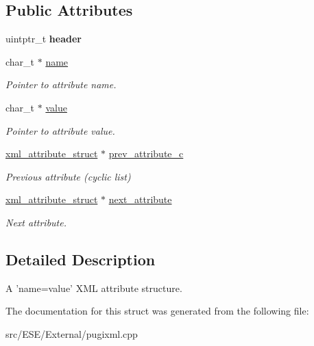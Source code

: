 \subsection*{Public Attributes}
\begin{DoxyCompactItemize}
\item 
\hypertarget{structpugi_1_1xml__attribute__struct_a0dca6ca6c129bbf87a7ebaf87f3e12de}{uintptr\-\_\-t {\bfseries header}}\label{structpugi_1_1xml__attribute__struct_a0dca6ca6c129bbf87a7ebaf87f3e12de}

\item 
\hypertarget{structpugi_1_1xml__attribute__struct_aa886c4aae23a132e1704717721ee2c19}{char\-\_\-t $\ast$ \hyperlink{structpugi_1_1xml__attribute__struct_aa886c4aae23a132e1704717721ee2c19}{name}}\label{structpugi_1_1xml__attribute__struct_aa886c4aae23a132e1704717721ee2c19}

\begin{DoxyCompactList}\small\item\em Pointer to attribute name. \end{DoxyCompactList}\item 
\hypertarget{structpugi_1_1xml__attribute__struct_ae652627d56cb9dcc0afdd1fbf6570364}{char\-\_\-t $\ast$ \hyperlink{structpugi_1_1xml__attribute__struct_ae652627d56cb9dcc0afdd1fbf6570364}{value}}\label{structpugi_1_1xml__attribute__struct_ae652627d56cb9dcc0afdd1fbf6570364}

\begin{DoxyCompactList}\small\item\em Pointer to attribute value. \end{DoxyCompactList}\item 
\hypertarget{structpugi_1_1xml__attribute__struct_a0e3a022235b316e4cfc1034ceb7d7862}{\hyperlink{structpugi_1_1xml__attribute__struct}{xml\-\_\-attribute\-\_\-struct} $\ast$ \hyperlink{structpugi_1_1xml__attribute__struct_a0e3a022235b316e4cfc1034ceb7d7862}{prev\-\_\-attribute\-\_\-c}}\label{structpugi_1_1xml__attribute__struct_a0e3a022235b316e4cfc1034ceb7d7862}

\begin{DoxyCompactList}\small\item\em Previous attribute (cyclic list) \end{DoxyCompactList}\item 
\hypertarget{structpugi_1_1xml__attribute__struct_a9860c0eb7fa72dc9b69ee9b0575f9efc}{\hyperlink{structpugi_1_1xml__attribute__struct}{xml\-\_\-attribute\-\_\-struct} $\ast$ \hyperlink{structpugi_1_1xml__attribute__struct_a9860c0eb7fa72dc9b69ee9b0575f9efc}{next\-\_\-attribute}}\label{structpugi_1_1xml__attribute__struct_a9860c0eb7fa72dc9b69ee9b0575f9efc}

\begin{DoxyCompactList}\small\item\em Next attribute. \end{DoxyCompactList}\end{DoxyCompactItemize}


\subsection{Detailed Description}
A 'name=value' X\-M\-L attribute structure. 

The documentation for this struct was generated from the following file\-:\begin{DoxyCompactItemize}
\item 
src/\-E\-S\-E/\-External/pugixml.\-cpp\end{DoxyCompactItemize}
